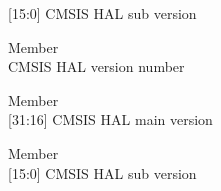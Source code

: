 \begin{DoxyRefList}
\label{deprecated__deprecated000038}%
%
\mbox{[}15\+:0\mbox{]} CMSIS HAL sub version  
\item[Member \doxylink{core__sc300_8h_a2f960c3c99ab33e1cf4b5287821c44dd}{\+\_\+\+\_\+\+SC300\+\_\+\+CMSIS\+\_\+\+VERSION} ]\hfill \\
\label{deprecated__deprecated000042}%
%
CMSIS HAL version number  
\item[Member \doxylink{core__sc300_8h_a0e2124db4f74f2b355904314accf1790}{\+\_\+\+\_\+\+SC300\+\_\+\+CMSIS\+\_\+\+VERSION\+\_\+\+MAIN} ]\hfill \\
\label{deprecated__deprecated000040}%
%
\mbox{[}31\+:16\mbox{]} CMSIS HAL main version  
\item[Member \doxylink{core__sc300_8h_a664c9e59952455ddeee28173b864fe9d}{\+\_\+\+\_\+\+SC300\+\_\+\+CMSIS\+\_\+\+VERSION\+\_\+\+SUB} ]\hfill \\
\label{deprecated__deprecated000041}%
%
\mbox{[}15\+:0\mbox{]} CMSIS HAL sub version 
\end{DoxyRefList}